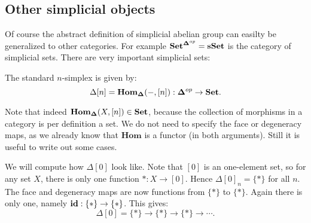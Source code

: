 
\subsection{Other simplicial objects}
Of course the abstract definition of simplicial abelian group can easilty be generalized to other categories. For example $\mathbf{Set}^{\mathbf{\Delta}^{op}} = \mathbf{sSet}$ is the category of simplicial sets. There are very important simplicial sets:

\begin{definition}
	The standard $n$-simplex is given by:
	$$\Delta[n] = \mathbf{Hom}_{\mathbf{\Delta}}(-, [n]) : \mathbf{\Delta}^{op} \to \mathbf{Set}.$$
\end{definition}

Note that indeed $\mathbf{Hom}_{\mathbf{\Delta}}(X, [n]) \in \mathbf{Set}$, because the collection of morphisms in a category is per definition a set. We do not need to specify the face or degeneracy maps, as we already know that $\mathbf{Hom}$ is a functor (in both arguments). Still it is useful to write out some cases.

\begin{example}
	We will compute how $\Delta[0]$ look like. Note that $[0]$ is an one-element set, so for any set $X$, there is only one function $\ast : X \to [0]$. Hence $\Delta[0]_n = \{\ast\}$ for all $n$. The face and degeneracy maps are now functions from $\{\ast\}$ to $\{\ast\}$. Again there is only one, namely $\mathbf{id} : \{\ast\} \to \{\ast\}$. This gives:
	$$ \Delta[0] = \{\ast\} \to \{\ast\} \to \{\ast\} \to \cdots. $$
\end{example}

